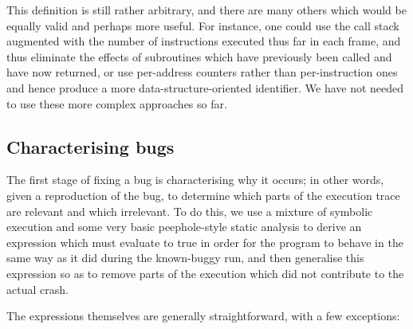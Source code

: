 \documentclass[10pt,a4paper]{report}
\begin{document}
This definition is still rather arbitrary, and there are many others
which would be equally valid and perhaps more useful.  For instance,
one could use the call stack augmented with the number of instructions
executed thus far in each frame, and thus eliminate the effects of
subroutines which have previously been called and have now returned,
or use per-address counters rather than per-instruction ones and hence
produce a more data-structure-oriented identifier.  We have not needed to use these more
complex approaches so far.

\subsection{Characterising bugs}

The first stage of fixing a bug is characterising why it occurs; in
other words, given a reproduction of the bug, to determine which parts
of the execution trace are relevant and which irrelevant.  To do this,
we use a mixture of symbolic execution and some very basic
peephole-style static analysis to derive an expression which must
evaluate to true in order for the program to behave in the same way as
it did during the known-buggy run, and then generalise this expression
so as to remove parts of the execution which did not contribute to the
actual crash.

The expressions themselves are generally straightforward, with a few
exceptions:
\end{document}
